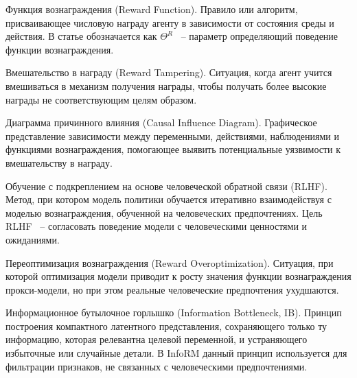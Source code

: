 \begin{definition}
    \label{def:rf}
    Функция вознаграждения (Reward Function). Правило или алгоритм, присваивающее числовую награду агенту в зависимости от состояния среды и действия. В статье обозначается как $\Theta^R$ ~-- параметр определяющий поведение функции вознаграждения.
\end{definition}

\begin{definition}
    \label{def:rt}
    Вмешательство в награду (Reward Tampering). Ситуация, когда агент учится вмешиваться в механизм получения награды, чтобы получать более высокие награды не соответствующим целям образом.
\end{definition}

\begin{definition}
    \label{def:casual_diag}
    Диаграмма причинного влияния (Causal Influence Diagram). Графическое представление зависимости между переменными, действиями, наблюдениями и функциями вознаграждения, помогающее выявить потенциальные уязвимости к вмешательству в награду.
\end{definition}

\begin{definition}
    \label{def:rlhf}
    Обучение с подкреплением на основе человеческой обратной связи (RLHF). Метод, при котором модель политики обучается итеративно взаимодействуя с моделью вознаграждения, обученной на человеческих предпочтениях. Цель RLHF ~-- согласовать поведение модели с человеческими ценностями и ожиданиями.
\end{definition}

\begin{definition}
    \label{def:reward_overopt}
    Переоптимизация вознаграждения (Reward Overoptimization). Ситуация, при которой оптимизация модели приводит к росту значения функции вознаграждения прокси-модели, но при этом реальные человеческие предпочтения ухудшаются. 
\end{definition}

\begin{definition}
    \label{def:ib}
    Информационное бутылочное горлышко (Information Bottleneck, IB). Принцип построения компактного латентного представления, сохраняющего только ту информацию, которая релевантна целевой переменной, и устраняющего избыточные или случайные детали. В InfoRM данный принцип используется для фильтрации признаков, не связанных с человеческими предпочтениями.
\end{definition}

